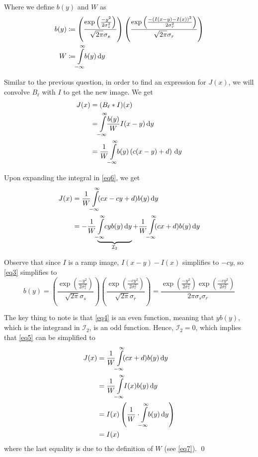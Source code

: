 \documentclass[a4paper]{article}
\begin{document}
\begin{enumerate}
Where we define $b(y)$ and $W$ as
\begin{align}
b(y) &\coloneqq \left ( \dfrac{\exp\left (\frac{-y^2}{2\sigma_s^2}\right )}{\sqrt{2\pi}\sigma_s} \right ) \left ( \dfrac{\exp\left (\frac{-(I(x - y) - I(x))^2}{2\sigma_r^2}\right )}{\sqrt{2\pi}\sigma_r} \right ) \label{eq3} \\
W &\coloneqq \int\limits_{\mathclap{-\infty}}^{\mathclap{\infty}}\! b(y)\, \mathrm{d}y \label{eq7}
\end{align}

Similar to the previous question, in order to find an expression for $J(x)$, we will convolve $B_\ell$ with $I$ to get the new image. We get
\begin{align}
J(x) &= (B_\ell * I)(x) \nonumber \\
&= \int\limits_{\mathclap{-\infty}}^{\mathclap{\infty}}\! \dfrac{b(y)}{W} I (x - y)\, \mathrm{d}y \nonumber \\
&= \dfrac{1}{W}\int\limits_{\mathclap{-\infty}}^{\mathclap{\infty}}\! b(y)\left ( c(x - y) + d\right )\, \mathrm{d}y
\label{eq6}
\end{align}

Upon expanding the integral in \eqref{eq6}, we get
\begin{align}
J(x) &= \dfrac{1}{W}\int\limits_{\mathclap{-\infty}}^{\mathclap{\infty}}\! (cx - cy + d) b(y)\, \mathrm{d}y \nonumber \\
&= -\dfrac{1}{W}\underbrace{\int\limits_{\mathclap{-\infty}}^{\mathclap{\infty}}\! cy b(y)\, \mathrm{d}y}_{\mathcal{I}_2} + \dfrac{1}{W}\int\limits_{\mathclap{-\infty}}^{\mathclap{\infty}}\! (cx + d) b(y)\, \mathrm{d}y
\label{eq5}
\end{align}

Observe that since $I$ is a ramp image, $I(x - y) - I(x)$ simplifies to $-cy$, so \eqref{eq3} simplifies to
\begin{equation}
b(y) = \left ( \dfrac{\exp\left (\frac{-y^2}{2\sigma_s^2}\right )}{\sqrt{2\pi}\sigma_s} \right ) \left ( \dfrac{\exp\left (\frac{-cy^2}{2\sigma_r^2}\right )}{\sqrt{2\pi}\sigma_r} \right ) = \dfrac{\exp\left (\frac{-y^2}{2\sigma_s^2}\right ) \exp\left (\frac{-cy^2}{2\sigma_r^2}\right )}{2\pi\sigma_s \sigma_r}
\label{eq4}
\end{equation}

The key thing to note is that \eqref{eq4} is an even function, meaning that $y b(y)$, which is the integrand in $\mathcal{I}_2$, is an odd function. Hence, $\mathcal{I}_2 = 0$, which implies that \eqref{eq5} can be simplified to
\begin{align*}
J(x) &= \dfrac{1}{W}\int\limits_{\mathclap{-\infty}}^{\mathclap{\infty}}\! (cx + d) b(y)\, \mathrm{d}y \\
&= \dfrac{1}{W}\int\limits_{\mathclap{-\infty}}^{\mathclap{\infty}}\! I(x) b(y)\, \mathrm{d}y \\
&= I(x) \left (\dfrac{1}{W}\cdot \int\limits_{\mathclap{-\infty}}^{\mathclap{\infty}}\! b(y)\, \mathrm{d}y \right ) \\
&= I(x)
\end{align*}
where the last equality is due to the definition of $W$ (see \eqref{eq7}). \qed


\end{enumerate}
\end{document}
